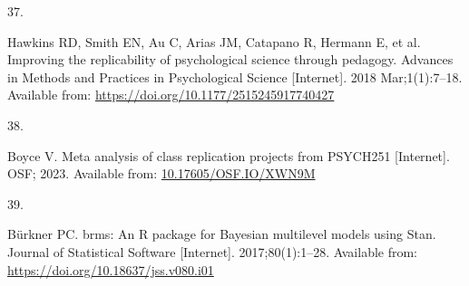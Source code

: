 \documentclass[
  english,
  a4paper,
]{article}
\newlength{\cslhangindent}
\newlength{\csllabelwidth}
\newlength{\cslentryspacingunit} %
\newenvironment{CSLReferences}[2] %
 {%
  \setlength{\parindent}{0pt}
  \ifodd #1
  \let\oldpar\par
  \def\par{\hangindent=\cslhangindent\oldpar}
  \fi
  \setlength{\parskip}{#2\cslentryspacingunit}
 }%
 {}
\newcommand{\CSLLeftMargin}[1]{\parbox[t]{\csllabelwidth}{#1}}
\newcommand{\CSLRightInline}[1]{\parbox[t]{\linewidth - \csllabelwidth}{#1}\break}
\begin{document}
\begin{CSLReferences}{0}{0}
\leavevmode{}%
\CSLLeftMargin{37. }%
\CSLRightInline{Hawkins RD, Smith EN, Au C, Arias JM, Catapano R, Hermann E, et al. Improving the replicability of psychological science through pedagogy. Advances in Methods and Practices in Psychological Science {[}Internet{]}. 2018 Mar;1(1):7--18. Available from: \url{https://doi.org/10.1177/2515245917740427}}

\leavevmode{}%
\CSLLeftMargin{38. }%
\CSLRightInline{Boyce V. Meta analysis of class replication projects from PSYCH251 {[}Internet{]}. OSF; 2023. Available from: \href{https://10.17605/OSF.IO/XWN9M}{10.17605/OSF.IO/XWN9M}}

\leavevmode{}%
\CSLLeftMargin{39. }%
\CSLRightInline{Bürkner PC. {brms}: An {R} package for {Bayesian} multilevel models using {Stan}. Journal of Statistical Software {[}Internet{]}. 2017;80(1):1--28. Available from: \url{https://doi.org/10.18637/jss.v080.i01}}

\end{CSLReferences}
\end{document}
